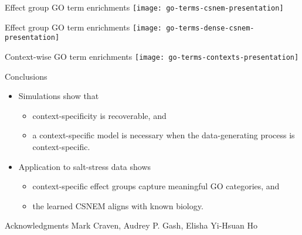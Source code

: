 \documentclass[aspectratio=169]{beamer}
\begin{document}

\begin{frame}{Effect group GO term enrichments}
\centering
\texttt{[image: go-terms-csnem-presentation]}
\end{frame}

\begin{frame}{Effect group GO term enrichments}
\centering
\texttt{[image: go-terms-dense-csnem-presentation]}
\end{frame}



\begin{frame}{Context-wise GO term enrichments}
\texttt{[image: go-terms-contexts-presentation]}
\end{frame}


\begin{frame}{Conclusions}
 \begin{itemize}
  \item Simulations show that
  \begin{itemize}
   \item context-specificity is recoverable, and
   \item a context-specific model is necessary when the data-generating process is context-specific.
  \end{itemize}
  \item Application to salt-stress data shows
  \begin{itemize}
   \item context-specific effect groups capture meaningful GO categories, and
   \item the learned CSNEM aligns with known biology.
  \end{itemize}
 \end{itemize}
 \pause
 \begin{block}{Acknowledgments}
   Mark Craven, Audrey P. Gash, Elisha Yi-Hsuan Ho %
 \end{block}
\end{frame}

\end{document}
